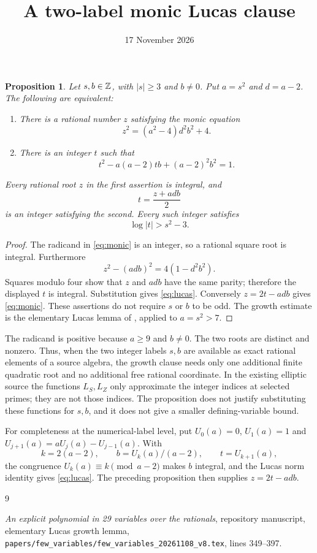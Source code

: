 \documentclass[11pt,a4paper]{article}
\title{A two-label monic Lucas clause}
\author{}\date{17 November 2026}
\newtheorem{proposition}{Proposition}
\begin{document}
\maketitle

\begin{proposition}
Let $s,b\in\mathbb Z$, with $|s|\ge3$ and $b\ne0$. Put
$a=s^2$ and $d=a-2$. The following are equivalent:
\begin{enumerate}
\item There is a rational number $z$ satisfying the monic equation
\begin{equation}\label{eq:monic}
 z^2=(a^2-4)d^2b^2+4.
\end{equation}
\item There is an integer $t$ such that
\begin{equation}\label{eq:lucas}
 t^2-a(a-2)tb+(a-2)^2b^2=1.
\end{equation}
\end{enumerate}
Every rational root $z$ in the first assertion is integral, and
\[
 t=\frac{z+adb}{2}
\]
is an integer satisfying the second. Every such integer satisfies
\[
 \log|t|>s^2-3.
\]
\end{proposition}
\begin{proof}
The radicand in \eqref{eq:monic} is an integer, so a rational square
root is integral. Furthermore
\[
 z^2-(adb)^2=4(1-d^2b^2).
\]
Squares modulo four show that $z$ and $adb$ have the same parity;
therefore the displayed $t$ is integral. Substitution gives
\eqref{eq:lucas}. Conversely $z=2t-adb$ gives
\eqref{eq:monic}. These assertions do not require $s$ or $b$ to be
odd. The growth estimate is the elementary Lucas lemma of
\cite{Lucas}, applied to $a=s^2>7$.
\end{proof}

The radicand is positive because $a\ge9$ and $b\ne0$.
The two roots are distinct and nonzero. Thus, when the two integer
labels $s,b$ are available as exact rational elements of a source
algebra, the growth clause needs only one additional finite quadratic
root and no additional free rational coordinate. In the existing
elliptic source the functions $L_S,L_Z$ only approximate the integer
indices at selected primes; they are not those indices. The proposition
does not justify substituting these functions for $s,b$, and it does
not give a smaller defining-variable bound.

For completeness at the numerical-label level, put
$U_0(a)=0$, $U_1(a)=1$ and
$U_{j+1}(a)=aU_j(a)-U_{j-1}(a)$. With
\[
 k=2(a-2),\qquad b=U_k(a)/(a-2),\qquad t=U_{k+1}(a),
\]
the congruence $U_k(a)\equiv k\pmod{a-2}$ makes $b$ integral,
and the Lucas norm identity gives \eqref{eq:lucas}.
The preceding proposition then supplies $z=2t-adb$.

\begin{thebibliography}{9}\raggedright
{}\emph{An explicit polynomial in 29 variables over the
rationals}, repository manuscript, elementary Lucas growth lemma,
\nolinkurl{papers/few_variables/few_variables_20261108_v8.tex},
lines 349--397.
\end{thebibliography}
\end{document}
